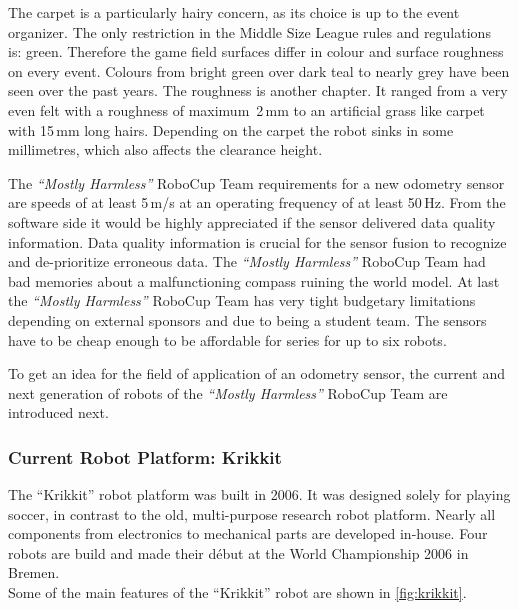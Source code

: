 \documentclass[12pt,a4paper]{article}
\newcommand{\MH}{\emph{``Mostly Harmless''} RoboCup Team\xspace}
\newcommand{\MSL}{Middle Size League\xspace}
\begin{document}
The carpet is a particularly hairy concern, as its choice is up to the event organizer.
The only restriction in the \MSL rules and regulations~\cite{msl-rules} is: green.
Therefore the game field surfaces differ in colour and surface roughness on every event.
Colours from bright green over dark teal to nearly grey have been seen over the past years.
The roughness is another chapter.
It ranged from a very even felt with a roughness of maximum~2\,mm to an artificial grass like carpet with 15\,mm long hairs. 
Depending on the carpet the robot sinks in some millimetres, which also affects the clearance height.

The \MH requirements for a new odometry sensor are speeds of at least 5\,m/s at an operating frequency of at least 50\,Hz.
From the software side it would be highly appreciated if the sensor delivered data quality information.
Data quality information is crucial for the sensor fusion to recognize and de-prioritize erroneous data.
The \MH had bad memories about a malfunctioning compass ruining the world model.
At last the \MH has very tight budgetary limitations depending on external sponsors and due to being a student team.
The sensors have to be cheap enough to be affordable for series for up to six robots.

To get an idea for the field of application of an odometry sensor, the current and next generation of robots of the \MH are introduced next.



\subsubsection{Current Robot Platform: Krikkit}
\label{sec:krikkit}

The ``Krikkit'' robot platform was built in 2006. %
It was designed solely for playing soccer, in contrast to the old, multi-purpose research robot platform.
Nearly all components from electronics to mechanical parts are developed in-house.
Four robots are build and made their d\'ebut at the World Championship 2006 in Bremen.\\
Some of the main features of the ``Krikkit'' robot are shown in \autoref{fig:krikkit}.
\end{document}
